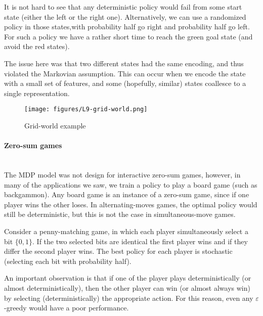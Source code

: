 It is not hard to see that any deterministic policy would fail from
some start state (either the left or the right one). Alternatively,
we can use a randomized policy in those states,with probability half
go right and probability half go left. For such a policy we have a
rather short time to reach the green goal state (and avoid the red
states).

The issue here was that two different states had the same encoding,
and thus violated the Markovian assumption. This can occur when we
encode the state with a small set of features, and some (hopefully,
similar) states coallesce to a single representation.

\begin{figure}
  \begin{centering}
  \texttt{[image: figures/L9-grid-world.png]}\\
  \caption{Grid-world example }\label{fig:L9-grid-world}
  \end{centering}
\end{figure}

\paragraph{Zero-sum games}\ \\
The MDP model was not design for interactive zero-sum games,
however, in many of the applications we saw, we train a policy to
play a board game (such as backgammon). Any board game is an
instance of a zero-sum game, since if one player wins the other
loses. In alternating-moves games, the optimal policy would still be
deterministic, but this is not the case in simultaneous-move games.


Consider a penny-matching game, in which each player simultaneously
select a bit $\{0,1\}$. If the two selected bits are identical the
first player wins and if they differ the second player wins. The
best policy for each player is stochastic (selecting each bit with
probability half).

An important observation is that if one of the player plays
deterministically (or almost deterministically), then the other
player can win (or almost always win) by selecting
(deterministically) the appropriate action. For this reason, even
any $\varepsilon$-greedy would have a poor performance.


